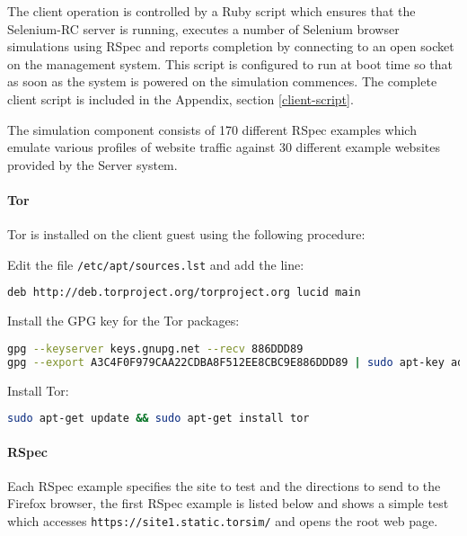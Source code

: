 The client operation is controlled by a Ruby script which ensures that the
Selenium-RC server is running, executes a number of Selenium browser simulations
using RSpec and reports completion by connecting to an open socket on the
management system. This script is configured to run at boot time so that as soon
as the system is powered on the simulation commences. The complete client script
is included in the Appendix, section \ref{client-script}.

The simulation component consists of 170 different RSpec examples which emulate
various profiles of website traffic against 30 different example websites
provided by the Server system.

\paragraph{Tor}
\label{install-tor}

Tor is installed on the client guest using the following procedure:

\begin{enumerate*}
  \item Edit the file \verb+/etc/apt/sources.lst+ and add the line:
    \begin{lstlisting}[language=sh]
deb http://deb.torproject.org/torproject.org lucid main
    \end{lstlisting}
  \item Install the GPG key for the Tor packages:
    \begin{lstlisting}[language=sh]
gpg --keyserver keys.gnupg.net --recv 886DDD89
gpg --export A3C4F0F979CAA22CDBA8F512EE8CBC9E886DDD89 | sudo apt-key add -
    \end{lstlisting}
  \item Install Tor:
    \begin{lstlisting}[language=sh]
sudo apt-get update && sudo apt-get install tor
    \end{lstlisting}
\end{enumerate*}

\paragraph{RSpec}

Each RSpec example specifies the site to test and the directions to send to the
Firefox browser, the first RSpec example is listed below and shows a simple test
which accesses \verb+https://site1.static.torsim/+ and opens the root web page.

